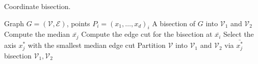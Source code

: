 \begin{algorithm}
    \caption{Coordinate bisection.}
    \label{alg:coord}
    \begin{algorithmic}[1]
        \Require Graph \( G = (\mathcal{V}, \mathcal{E}) \), points \( P_i = (x_{1}, \dots, x_{d})_i \)
    \Ensure A bisection of \( G \) into \(\mathcal{V}_1\) and \(\mathcal{V}_2\)
            \State Compute the median \(\bar{x_j}\)
            \State Compute the edge cut for the bisection at \(\bar{x_i}\)
        \EndFor
        \State Select the axis \(x_j^*\) with the smallest median edge cut
        \State Partition \(\mathcal{V}\) into \(\mathcal{V}_1\) and \(\mathcal{V}_2\) via \(\bar{x_j^*}\) bisection
        \State \Return \(\mathcal{V}_1, \mathcal{V}_2\)
    \EndFunction
    \end{algorithmic}
\end{algorithm}